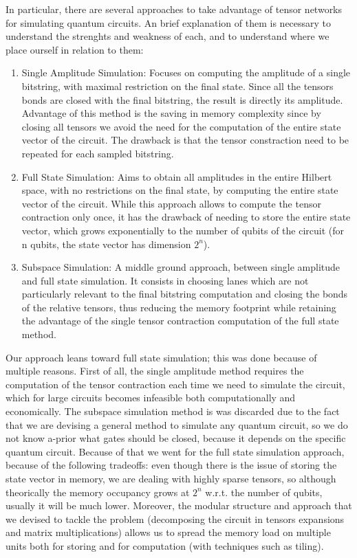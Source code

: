 \documentclass[12pt,oneside,a4paper]{article}
\begin{document}
In particular, there are several approaches to take advantage of tensor networks for simulating quantum circuits. An brief explanation of them is necessary to understand the strenghts and weakness of each, and to understand where we place ourself in relation to them:
\begin{enumerate}
    \item Single Amplitude Simulation: Focuses on computing the amplitude of a single bitstring, with maximal restriction on the final state. Since all the tensors bonds are closed with the final bitstring, the result is directly its amplitude. Advantage of this method is the saving in memory complexity since by closing all tensors we avoid the need for the computation of the entire state vector of the circuit. The drawback is that the tensor constraction need to be repeated for each sampled bitstring. %
    \item Full State Simulation: Aims to obtain all amplitudes in the entire Hilbert space, with no restrictions on the final state, by computing the entire state vector of the circuit. While this approach allows to compute the tensor contraction only once, it has the drawback of needing to store the entire state vector, which grows exponentially to the number of qubits of the circuit (for n qubits, the state vector has dimension $2^n$). %
    \item Subspace Simulation: A middle ground approach, between single amplitude and full state simulation. It consists in choosing lanes which are not particularly relevant to the final bitstring computation and closing the bonds of the relative tensors, thus reducing the memory footprint while retaining the advantage of the single tensor contraction computation of the full state method. %
\end{enumerate}
Our approach leans toward full state simulation; this was done because of multiple reasons. First of all, the single amplitude method requires the computation of the tensor contraction each time we need to simulate the circuit, which for large circuits becomes infeasible both computationally and economically. The subspace simulation method is was discarded due to the fact that we are devising a general method to simulate any quantum circuit, so we do not know a-prior what gates should be closed, because it depends on the specific quantum circuit. Because of that we went for the full state simulation approach, because of the following tradeoffs: even though there is the issue of storing the state vector in memory, we are dealing with highly sparse tensors, so although theorically the memory occupancy grows at $2^n$ w.r.t. the number of qubits, usually it will be much lower. Moreover, the modular structure and approach that we devised to tackle the problem (decomposing the circuit in tensors expansions and matrix multiplications) allows us to spread the memory load on multiple units both for storing and for computation (with techniques such as tiling).
\end{document}
